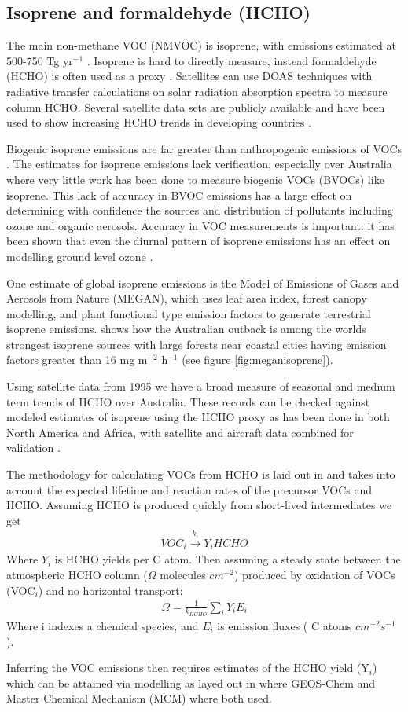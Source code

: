 \subsection{Isoprene and formaldehyde (HCHO)}

The main non-methane VOC (NMVOC) is isoprene, with emissions estimated at 500-750 Tg yr$^{-1}$ \cite{Guenther_2006}.
Isoprene is hard to directly measure, instead formaldehyde (HCHO) is often used as a proxy \cite{Marais_2012,bauwens2013satellite}.
Satellites can use DOAS techniques with radiative transfer calculations on solar radiation absorption spectra to measure column HCHO.
Several satellite data sets are publicly available and have been used to show increasing HCHO trends in developing countries \cite{Mahajan_2015}.

Biogenic isoprene emissions are far greater than anthropogenic emissions of VOCs \cite{Guenther_2006}. 
The estimates for isoprene emissions lack verification, especially over Australia where very little work has been done to measure biogenic VOCs (BVOCs) like isoprene.
This lack of accuracy in BVOC emissions has a large effect on determining with confidence the sources and distribution of pollutants including ozone and organic aerosols.
Accuracy in VOC measurements is important: it has been shown that even the diurnal pattern of isoprene emissions has an effect on modelling ground level ozone \cite{Hewitt_2011,Fan_2004}.

One estimate of global isoprene emissions is the Model of Emissions of Gases and Aerosols from Nature (MEGAN), which uses leaf area index, forest canopy modelling, and plant functional type emission factors to generate terrestrial isoprene emissions.
\citet{Guenther_2006} shows how the Australian outback is among the worlds strongest isoprene sources with large forests near coastal cities having emission factors greater than 16 mg m$^{-2}$ h$^{-1}$ (see figure \ref{fig:meganisoprene}).

Using satellite data from 1995 we have a broad measure of seasonal and medium term trends of HCHO over Australia.
These records can be checked against modeled estimates of isoprene using the HCHO proxy as has been done in both North America and Africa, with satellite and aircraft data combined for validation \cite{Millet_2006, Marais_2014}.

The methodology for calculating VOCs from HCHO is laid out in \citet{Palmer_2003} and takes into account the expected lifetime and reaction rates of the precursor VOCs and HCHO.
Assuming HCHO is produced quickly from short-lived intermediates we get
\begin{eqnarray*}
VOC_i \overset{k_i}{\rightarrow} Y_i HCHO
\end{eqnarray*}
Where $Y_i$ is HCHO yields per C atom.
Then assuming a steady state between the atmospheric HCHO column ($\Omega$ molecules $cm^{-2}$)  produced by oxidation of VOCs (VOC$_i$) and no horizontal transport:
\begin{eqnarray*}
\Omega = \frac{1}{k_{HCHO}} \sum_{i} Y_i E_i
\end{eqnarray*}
Where i indexes a chemical species, and $E_i$ is emission fluxes ( C atoms $cm^{-2}s^{-1}$).

Inferring the VOC emissions then requires estimates of the HCHO yield (Y$_i$) which can be attained via modelling as layed out in \citet{Millet_2006} where GEOS-Chem and Master Chemical Mechanism (MCM) where both used.

